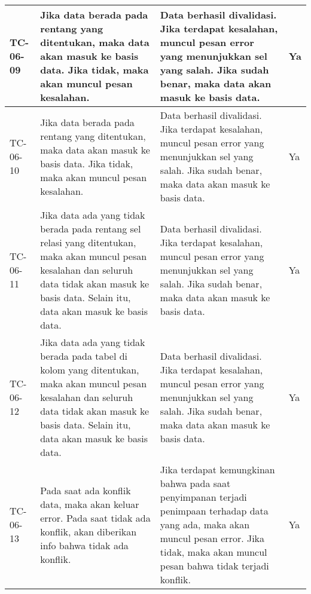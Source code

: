 \begin{small}
\begin{longtable}{ | p{2cm} | p{4cm} | p{4cm} | p{2cm} | }
	\\ \hline TC-06-09 & Jika data berada pada rentang yang ditentukan, maka data akan masuk ke basis data. Jika tidak, maka akan muncul pesan kesalahan. & Data berhasil divalidasi. Jika terdapat kesalahan, muncul pesan error yang menunjukkan sel yang salah. Jika sudah benar, maka data akan masuk ke basis data. & Ya
	\\ \hline TC-06-10 & Jika data berada pada rentang yang ditentukan, maka data akan masuk ke basis data. Jika tidak, maka akan muncul pesan kesalahan. & Data berhasil divalidasi. Jika terdapat kesalahan, muncul pesan error yang menunjukkan sel yang salah. Jika sudah benar, maka data akan masuk ke basis data. & Ya
	\\ \hline TC-06-11 & Jika data ada yang tidak berada pada rentang sel relasi yang ditentukan, maka akan muncul pesan kesalahan dan seluruh data tidak akan masuk ke basis data. Selain itu, data akan masuk ke basis data. & Data berhasil divalidasi. Jika terdapat kesalahan, muncul pesan error yang menunjukkan sel yang salah. Jika sudah benar, maka data akan masuk ke basis data. & Ya
	\\ \hline TC-06-12 & Jika data ada yang tidak berada pada tabel di kolom yang ditentukan, maka akan muncul pesan kesalahan dan seluruh data tidak akan masuk ke basis data. Selain itu, data akan masuk ke basis data. & Data berhasil divalidasi. Jika terdapat kesalahan, muncul pesan error yang menunjukkan sel yang salah. Jika sudah benar, maka data akan masuk ke basis data. & Ya
	\\ \hline TC-06-13 & Pada saat ada konflik data, maka akan keluar error. Pada saat tidak ada konflik, akan diberikan info bahwa tidak ada konflik. & Jika terdapat kemungkinan bahwa pada saat penyimpanan terjadi penimpaan terhadap data yang ada, maka akan muncul pesan error. Jika tidak, maka  akan muncul pesan bahwa tidak terjadi konflik. & Ya

	\\ \hline
\end{longtable}
\end{small}
